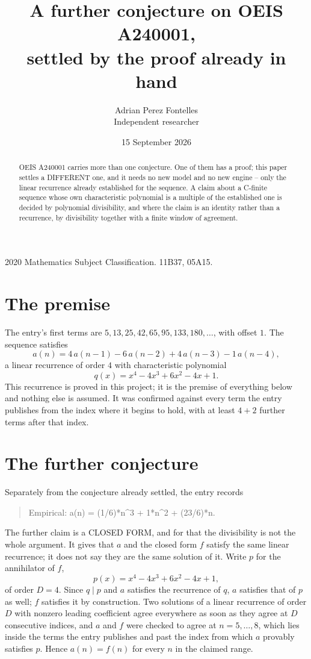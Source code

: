 \documentclass[11pt,a4paper]{article}
\title{A further conjecture on OEIS A240001,\\ \large settled by the proof already in hand}
\author{Adrian Perez Fontelles\\ \small Independent researcher}
\date{15 September 2026}
\theoremstyle{plain}
\theoremstyle{definition}
\begin{document}
\maketitle

\begin{abstract}
OEIS A240001 carries more than one conjecture. One of them has a proof; this paper settles a
DIFFERENT one, and it needs no new model and no new engine -- only the linear recurrence already
established for the sequence. A claim about a C-finite sequence whose own characteristic
polynomial is a multiple of the established one is decided by polynomial divisibility, and where
the claim is an identity rather than a recurrence, by divisibility together with a finite window
of agreement.
\end{abstract}

\noindent\small 2020 Mathematics Subject Classification. 11B37, 05A15.\normalsize

\section{The premise}

The entry's first terms are $5, 13, 25, 42, 65, 95, 133, 180,\dots$, with offset $1$. The sequence satisfies
\[
  a(n)=4\,a(n-1) - 6\,a(n-2) + 4\,a(n-3) - 1\,a(n-4) ,
\]
a linear recurrence of order $4$ with characteristic polynomial
\[
  q(x)=x^{4} - 4 x^{3} + 6 x^{2} - 4 x + 1 .
\]
This recurrence is proved in this project; it is the premise of everything below and nothing else is assumed.
It was confirmed against every term the entry publishes from the index where it begins to hold,
with at least $4+2$ further terms after that index.

\section{The further conjecture}

Separately from the conjecture already settled, the entry records

\begin{quote}\raggedright Empirical: a(n) = (1/6)*n\^{}3 + 1*n\^{}2 + (23/6)*n.\end{quote}

The further claim is a CLOSED FORM, and for that the divisibility is not the whole argument. It
gives that $a$ and the closed form $f$ satisfy the same linear recurrence; it does not say they
are the same solution of it. Write $p$ for the annihilator of $f$,
\[
  p(x)=x^{4} - 4 x^{3} + 6 x^{2} - 4 x + 1 ,
\]
of order $D=4$. Since $q\mid p$ and $a$ satisfies the recurrence of $q$, $a$ satisfies that of
$p$ as well; $f$ satisfies it by construction. Two solutions of a linear recurrence of order $D$
with nonzero leading coefficient agree everywhere as soon as they agree at $D$ consecutive
indices, and $a$ and $f$ were checked to agree at $n=5,\dots,8$,
which lies inside the terms the entry publishes and past the index from which $a$ provably
satisfies $p$. Hence $a(n)=f(n)$ for every $n$ in the claimed range.
\end{document}

